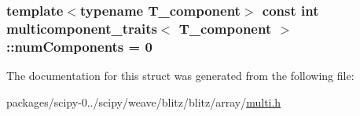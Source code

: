 \subsubsection[{num\+Components}]{\setlength{\rightskip}{0pt plus 5cm}template$<$typename T\+\_\+component$>$ const int {\bf multicomponent\+\_\+traits}$<$ T\+\_\+component $>$\+::num\+Components = 0\hspace{0.3cm}{\ttfamily [static]}}\label{structmulticomponent__traits_a06d5141cceb4a3c652272b7685997e83}


The documentation for this struct was generated from the following file\+:\begin{DoxyCompactItemize}
\item 
packages/scipy-\/0../scipy/weave/blitz/blitz/array/\hyperlink{multi_8h}{multi.\+h}\end{DoxyCompactItemize}
